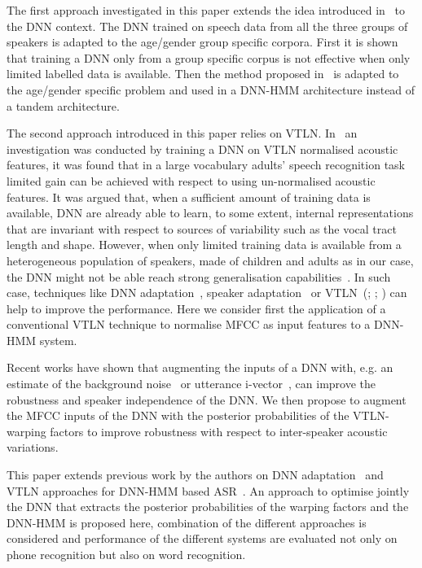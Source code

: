 \documentclass{nle}
\begin{document}
The  first  approach  investigated   in  this  paper  extends  the  idea
introduced in~\citet{YocMor92} to the  DNN context.  The DNN trained on
speech data  from all the three  groups of speakers is  adapted to the
age/gender group specific corpora.  First  it is shown that training a
DNN  only from  a group  specific corpus  is not  effective  when only
limited  labelled  data  is   available.   Then  the  method  proposed
in~\citet{thomas13} is  adapted to the age/gender  specific problem and
used in a DNN-HMM architecture instead of a tandem architecture.

The second approach introduced in this paper relies on VTLN. 
In~\citet{seide11} an  investigation was conducted  by training a
DNN on VTLN normalised acoustic features, it was found that in a large
vocabulary  adults'  speech  recognition  task  limited  gain  can  be
achieved with respect to using un-normalised acoustic features.  It was
argued that, when  a sufficient amount of training  data is available,
DNN   are  already   able  to   learn,  to   some   extent,  internal
representations  that  are  invariant   with  respect  to  sources  of
variability such as  the vocal tract length and  shape.  However, when
only  limited  training  data   is  available  from  a  heterogeneous
population of speakers,  made of children and adults  as in our case,
the   DNN   might   not    be   able   reach   strong   generalisation
capabilities~\citep*{SerGiu2014}.   In such  case,  techniques like  DNN
adaptation~\citep{vietbac10,swietojanski12,thomas13}, speaker
adaptation~\citep*{abdel2013rapid,liao2013speaker} or
VTLN~(\citealp*{EidGis96}; \citealp{LeeRos96}; \citealp*{WegMcaOrlPek96})  can help to  improve the
performance. Here we consider  first the application of a conventional
VTLN technique to normalise MFCC as input features to a DNN-HMM system.

Recent  works have shown  that augmenting  the inputs  of a  DNN with,
e.g.  an  estimate  of  the background  noise~\citep*{export:194344}  or
utterance  i-vector~\citep*{42536},  can   improve  the  robustness  and
speaker independence of  the DNN. We then propose  to augment the MFCC
inputs of the DNN with the posterior probabilities of the VTLN-warping
factors to  improve robustness with respect  to inter-speaker acoustic
variations.

This   paper  extends   previous  work   by  the   authors   on  DNN
adaptation~\citep{SerGiu2014}      and      VTLN     approaches      for
DNN-HMM based ASR~\citep*{SerGiu2014a}.  An approach to  optimise jointly  the DNN
that extracts the posterior probabilities of  the warping factors and the DNN-HMM is
proposed here,  combination of the different  approaches is considered
and performance of the different systems are evaluated not only on phone
recognition but also on word recognition. 
\end{document}
